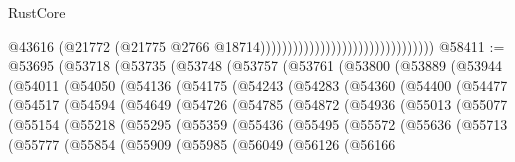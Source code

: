 \begin{lexlean}{RustCore}
\begin{coremodule}
                                                                @43616
                                                                (@21772
                                                                  (@21775
                                                                    @2766
                                                                    @18714))))))))))))))))))))))))))))))))
@58411 := @53695
    (@53718
      (@53735
        (@53748
          (@53757
            (@53761
              (@53800
                (@53889
                  (@53944
                    (@54011
                      (@54050
                        (@54136
                          (@54175
                            (@54243
                              (@54283
                                (@54360
                                  (@54400
                                    (@54477
                                      (@54517
                                        (@54594
                                          (@54649
                                            (@54726
                                              (@54785
                                                (@54872
                                                  (@54936
                                                    (@55013
                                                      (@55077
                                                        (@55154
                                                          (@55218
                                                            (@55295
                                                              (@55359
                                                                (@55436
                                                                  (@55495
                                                                    (@55572
                                                                      (@55636
                                                                        (@55713
                                                                          (@55777
                                                                            (@55854
                                                                              (@55909
                                                                                (@55985
                                                                                  (@56049
                                                                                    (@56126
                                                                                      (@56166

\end{coremodule}
\end{lexlean}

